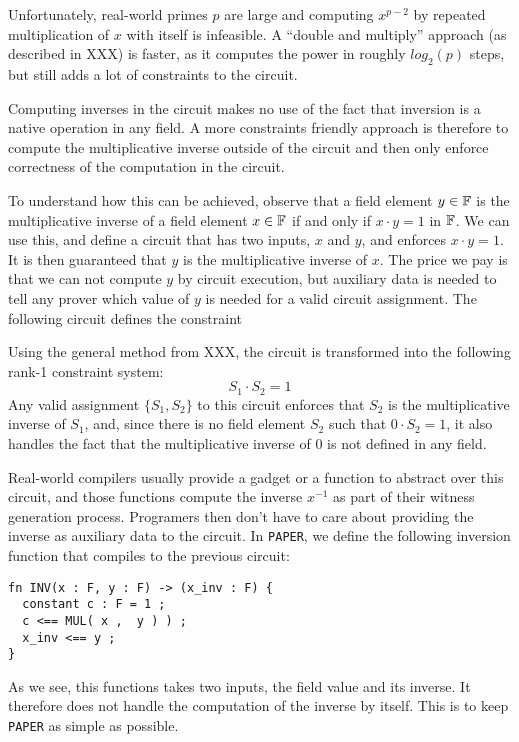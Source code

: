 Unfortunately, real-world primes $p$ are large and computing $x^{p-2}$ by repeated multiplication of $x$ with itself is infeasible. A ``double and multiply'' approach (as described in XXX) is faster, as it computes the power in roughly $log_2(p)$ steps, but still adds a lot of constraints to the circuit. 

Computing inverses in the circuit makes no use of the fact that inversion is a native operation in any field. A more constraints friendly approach is therefore to compute the multiplicative inverse outside of the circuit and then only enforce correctness of the computation in the circuit. 

To understand how this can be achieved, observe that a field element $y\in \mathbb{F}$ is the multiplicative inverse of a field element $x\in \mathbb{F}$ if and only if $x\cdot y =1$ in $\mathbb{F}$. We can use this, and define a circuit that has two inputs, $x$ and $y$, and enforces $x\cdot y =1$. It is then guaranteed that $y$ is the multiplicative inverse of $x$. The price we pay is that we can not compute $y$ by circuit execution, but auxiliary data is needed to tell any prover which value of $y$ is needed for a valid circuit assignment.  The following circuit defines the constraint
\begin{center}
\end{center}
Using the general method from XXX, the circuit is transformed into the following rank-1 constraint system:
\begin{equation}
S_1 \cdot S_2 = 1
\end{equation}
Any valid assignment $\{S_1,S_2\}$ to this circuit enforces that $S_2$ is the multiplicative inverse of $S_1$, and, since there is no field element $S_2$ such that $0\cdot S_2=1$, it also handles the fact that the multiplicative inverse of $0$ is not defined in any field. 

Real-world compilers usually provide a gadget or a function to abstract over this circuit, and those functions compute the inverse $x^{-1}$ as part of their witness generation process. Programers then don't have to care about providing the inverse as auxiliary data to the circuit. In \texttt{PAPER}, we define the following inversion function that compiles to the previous circuit:
\begin{lstlisting}
fn INV(x : F, y : F) -> (x_inv : F) {
  constant c : F = 1 ;
  c <== MUL( x ,  y ) ) ;
  x_inv <== y ;
}
\end{lstlisting}
As we see, this functions takes two inputs, the field value and its inverse. It therefore does not handle the computation of the inverse by itself. This is to keep \texttt{PAPER} as simple as possible. 

